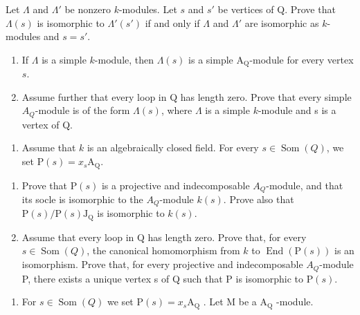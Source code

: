Let \(\Lambda\) and \(\Lambda'\) be nonzero \(k\)-modules. Let \(s\) and \(s'\) be vertices of Q. Prove that \(\Lambda(s)\) is isomorphic to \(\Lambda'(s')\) if and only if \(\Lambda\) and \(\Lambda'\) are isomorphic as \(k\)-modules and \(s = s'\).

\begin{enumerate}
\def\labelenumi{\alph{enumi})}
\setcounter{enumi}{2}
\item
  If \(\Lambda\) is a simple \(k\)-module, then \(\Lambda(s)\) is a simple \(\mathrm{A}_{\mathrm{Q}}\)-module for every vertex \(s\).
\item
  Assume further that every loop in Q has length zero. Prove that every simple \(A_Q\)-module is of the form \(\Lambda(s)\), where \(\Lambda\) is a simple \(k\)-module and s is a vertex of Q.
\end{enumerate}

\begin{enumerate}
\def\labelenumi{\arabic{enumi})}
\setcounter{enumi}{6}
\tightlist
\item
  Assume that \(k\) is an algebraically closed field. For every \(s \in \operatorname{Som}(Q)\), we set \(\mathrm{P}(s) = x_s\mathrm{A}_{\mathrm{Q}}\).
\end{enumerate}

\begin{enumerate}
\def\labelenumi{\alph{enumi})}
\item
  Prove that \(\mathrm{P}(s)\) is a projective and indecomposable \(A_{Q}\)-module, and that its socle is isomorphic to the \(A_{Q}\)-module \(k(s)\). Prove also that \(\mathrm{P}(s)/\mathrm{P}(s)\mathrm{J}_{\mathrm{Q}}\) is isomorphic to \(k(s)\).
\item
  Assume that every loop in Q has length zero. Prove that, for every \(s \in \operatorname{Som}(Q)\), the canonical homomorphism from \(k\) to \(\operatorname{End}(\mathrm{P}(s))\) is an isomorphism. Prove that, for every projective and indecomposable \(A_Q\)-module P, there exists a unique vertex s of Q such that P is isomorphic to \(\mathrm{P}(s)\).
\end{enumerate}

\begin{enumerate}
\def\labelenumi{\arabic{enumi})}
\setcounter{enumi}{7}
\tightlist
\item
  For \(s \in \operatorname{Som}(Q)\) we set \(\mathrm{P}(s) = x_s\mathrm{A}_{\mathrm{Q}}\) . Let M be a \(\mathrm{A}_{\mathrm{Q}}\) -module.
\end{enumerate}

